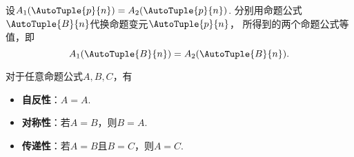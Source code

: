 \begin{theorem}
设\(A_1(\AutoTuple{p}{n}) = A_2(\AutoTuple{p}{n})\).
分别用命题公式\(\AutoTuple{B}{n}\)代换命题变元\(\AutoTuple{p}{n}\)，
所得到的两个命题公式等值，即\begin{equation*}
	A_1(\AutoTuple{B}{n}) = A_2(\AutoTuple{B}{n}).
\end{equation*}
\end{theorem}

\begin{theorem}
对于任意命题公式\(A,B,C\)，有\begin{itemize}
	\item {\rm\bf 自反性}：\(A = A\).
	\item {\rm\bf 对称性}：若\(A = B\)，则\(B = A\).
	\item {\rm\bf 传递性}：若\(A = B\)且\(B = C\)，则\(A = C\).
\end{itemize}
\end{theorem}

